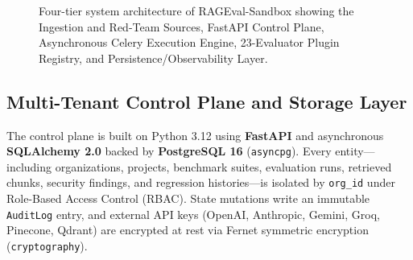 \documentclass[conference]{IEEEtran}
\begin{document}
\begin{figure}[!t]
{%
}
\caption{Four-tier system architecture of RAGEval-Sandbox showing the Ingestion and Red-Team Sources, FastAPI Control Plane, Asynchronous Celery Execution Engine, 23-Evaluator Plugin Registry, and Persistence/Observability Layer.}
\label{fig:architecture}
\end{figure}

\subsection{Multi-Tenant Control Plane and Storage Layer}
The control plane is built on Python 3.12 using \textbf{FastAPI} and asynchronous \textbf{SQLAlchemy 2.0} backed by \textbf{PostgreSQL 16} (\texttt{asyncpg}). Every entity—including organizations, projects, benchmark suites, evaluation runs, retrieved chunks, security findings, and regression histories—is isolated by \texttt{org\_id} under Role-Based Access Control (RBAC). State mutations write an immutable \texttt{AuditLog} entry, and external API keys (OpenAI, Anthropic, Gemini, Groq, Pinecone, Qdrant) are encrypted at rest via Fernet symmetric encryption (\texttt{cryptography}).
\end{document}
